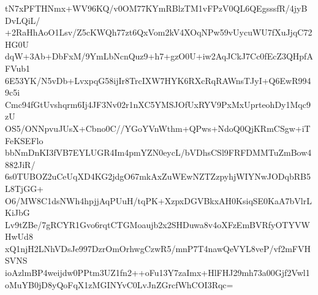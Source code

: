 tN7xPFTHNmx+WV96KQ/v0OM77KYmRBlzTM1vFPzV0QL6QEgsssfR/4jyBDvLQiL/
+2RaHhAoO1Lsv/Z5cKWQh77zt6QxVom2kV4XOqNPw59vUycuWU7fXuJjqC72HG0U
dqW+3Ab+DbFxM/9YmLbNcnQuz9+h7+gzO0U+iw2AqJCkJ7Cc0fEcZ3QHpfAFVub1
6E53YK/N5vDb+LvxpqG58ijIr8TrcIXW7HYK6RXcRqRAWnsTJyI+Q6EwR9949c5i
Cmc94fGtUvshqrm6Ij4JF3Nv02r1nXC5YMSJOfUxRYV9PxMxUprteohDy1Mqc9zU
OS5/ONNpvuJUsX+Cbno0C//YGoYVnWthm+QPws+NdoQ0QjKRmCSgw+iTFeKSEFlo
bbNmDnKI3fVB7EYLUGR4Im4pmYZN0eycL/bVDhsCSl9FRFDMMTuZmBow4882JiR/
6s0TUBOZ2uCeUqXD4KG2jdgO67mkAxZuWEwNZTZzpyhjWIYNwJODqbRB5L8TjGG+
O6/MW8C1dsNWh4hpjjAqPUuH/tqPK+XzpxDGVBkxAH0KsiqSE0KaA7bVlrLKiJbG
Lv9tZBe/7gRCYR1Gvo6rqtCTGMoaujb2x2SHDuwa8v4oXFzEmBVRfyOTYVWHwUd8
xQ1njH2LNhVDsJe997DzrOmOrhwgCzwR5/mnP7T4nawQeVYL8veP/vf2mFVHSVNS
ioAzlmBP4weijdw0PPtm3UZ1fn2++oFu13Y7zaImx+HlFHJ29mh73a00Gjf2Vwl1
oMuYB0jD8yQoFqX1zMGINYvC0LvJnZGrcfWhCOI3Rqc=
